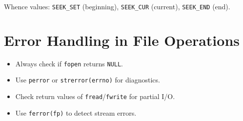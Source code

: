 \documentclass[11pt,a4paper]{article}
\begin{document}
Whence values: \texttt{SEEK\_SET} (beginning), \texttt{SEEK\_CUR} (current),
\texttt{SEEK\_END} (end).

\section{Error Handling in File Operations}
\begin{itemize}
  \item Always check if \texttt{fopen} returns \texttt{NULL}.
  \item Use \texttt{perror} or \texttt{strerror(errno)} for diagnostics.
  \item Check return values of \texttt{fread}/\texttt{fwrite} for partial I/O.
  \item Use \texttt{ferror(fp)} to detect stream errors.
\end{itemize}
\end{document}
